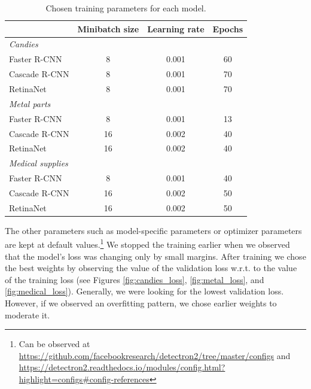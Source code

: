 \begin{table}[h]
	\centering
	\begin{tabular}{l|c|c|c}
		                            & Minibatch size & Learning rate & Epochs \\
		\hline
		\textit{Candies}            &                &               &        \\
		\hspace{0.1cm}Faster R-CNN  & 8              & 0.001         & 60     \\
		\hspace{0.1cm}Cascade R-CNN & 8              & 0.001         & 70     \\
		\hspace{0.1cm}RetinaNet     & 8              & 0.001         & 70     \\
		\hline
		\textit{Metal parts}        &                &               &        \\
		\hspace{0.1cm}Faster R-CNN  & 8              & 0.001         & 13     \\
		\hspace{0.1cm}Cascade R-CNN & 16             & 0.002         & 40     \\
		\hspace{0.1cm}RetinaNet     & 16             & 0.002         & 40     \\
		\hline
		\textit{Medical supplies}   &                &               &        \\
		\hspace{0.1cm}Faster R-CNN  & 8              & 0.001         & 40     \\
		\hspace{0.1cm}Cascade R-CNN & 16             & 0.002         & 50     \\
		\hspace{0.1cm}RetinaNet     & 16             & 0.002         & 50
	\end{tabular}
	\caption{Chosen training parameters for each model.}
	\label{tab:parameters}
\end{table}
The other parameters such as model-specific parameters or optimizer parameters
are kept at default values.\footnote{Can be observed at
	\url{https://github.com/facebookresearch/detectron2/tree/master/configs} and \\
	\url{https://detectron2.readthedocs.io/modules/config.html?highlight=configs\#config-references}}
We stopped the training earlier when we observed that the model's loss was
changing only by small margins. After training we chose the best weights by
observing the value of the validation loss w.r.t. to the value of the training
loss (see Figures \ref{fig:candies_loss}, \ref{fig:metal_loss}, and
\ref{fig:medical_loss}). Generally, we were looking for the lowest validation
loss. However, if we observed an overfitting pattern, we chose earlier weights
to moderate it.

